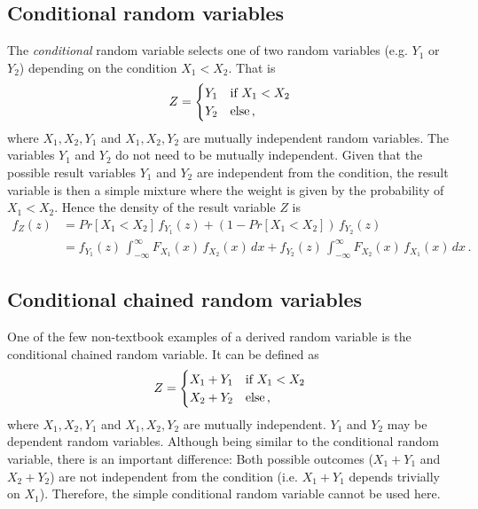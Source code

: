 \subsection{Conditional random variables}
The \emph{conditional} random variable selects one of two random variables (e.g. $Y_1$ or $Y_2$) depending
on the condition $X_1 < X_2$. That is 
\begin{equation}
 Z = \begin{cases}
   Y_1 & \mbox{if } X_1 < X_2\\
   Y_2 & \mbox{else\,,} 
 \end{cases} \nonumber
\end{equation}
where $X_1, X_2, Y_1$ and $X_1, X_2, Y_2$ are mutually independent random variables. The variables
$Y_1$ and $Y_2$ do not need to be mutually independent. Given that the possible result variables $Y_1$
and $Y_2$ are independent from the condition, the result variable is then a simple mixture where the weight
is given by the probability of $X_1<X_2$. Hence the density of the result variable $Z$ is
\begin{align}
 f_Z(z) &= Pr[X_1<X_2]\,f_{Y_1}(z) + \left(1-Pr[X_1<X_2]\right)\,f_{Y_2}(z) \nonumber \\
    &= f_{Y_1}(z)\,\int_{-\infty}^{\infty}F_{X_1}(x)\,f_{X_2}(x)\,dx + 
    f_{Y_2}(z)\,\int_{-\infty}^{\infty}F_{X_2}(x)\,f_{X_1}(x)\,dx\,.\nonumber
\end{align}

\subsection{Conditional chained random variables}
One of the few non-textbook examples of a derived random variable is the conditional chained random variable. 
It can be defined as
\begin{equation}
 Z = \begin{cases}
   X_1 + Y_1 & \mbox{if } X_1 < X_2\\
   X_2 + Y_2 & \mbox{else\,,} 
 \end{cases} \nonumber
\end{equation}
where $X_1, X_2, Y_1$ and $X_1, X_2, Y_2$ are mutually independent. $Y_1$ and $Y_2$ may be 
dependent random variables. Although being similar to the conditional random variable, there is an 
important difference: Both possible outcomes ($X_1+Y_1$ and $X_2+Y_2$) 
are not independent from the condition (i.e. $X_1+Y_1$ depends trivially on $X_1$).
Therefore, the simple conditional random variable cannot be used here. 

